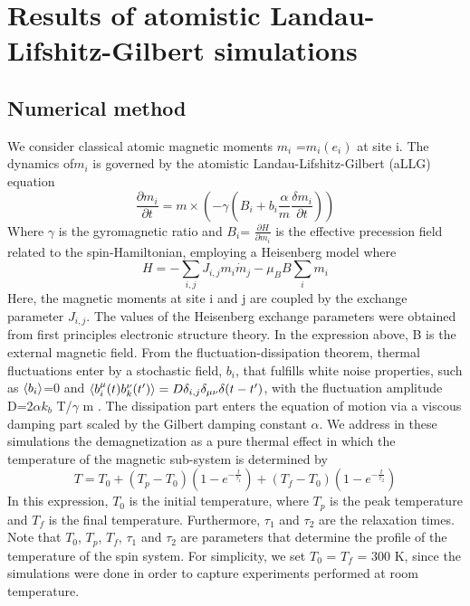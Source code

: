 \section{Results of atomistic Landau-Lifshitz-Gilbert simulations}

\subsection{Numerical method}
We consider classical atomic magnetic moments {$m_i$ }=$m_i(e_i)$ at site i. The dynamics of{$m_i$ }  is governed by the atomistic Landau-Lifshitz-Gilbert (aLLG) equation \cite{Antropov1996}
\begin{equation}
\frac{\partial m_i}{\partial t} = m \times (-\gamma(B_i+b_i\frac{\alpha}{m}\frac{\delta m_i}{\partial t}))
\end{equation}
Where $\gamma$ is the gyromagnetic ratio and $B_i$=  $\frac{\partial H}{\partial m_i}$ is the effective precession field related to the spin-Hamiltonian, employing a Heisenberg model where
\begin{equation}
H = - \sum_{i,j}J_{i,j}m_i \dot m_j - \mu_B B \sum_i m_i
\end{equation}
Here, the magnetic moments at site i and j are coupled by the exchange parameter $J_{i,j}$. The values of the Heisenberg exchange parameters were obtained from first principles electronic structure theory. In the expression above, B is the external magnetic field. From the fluctuation-dissipation theorem, thermal fluctuations enter by a stochastic field, $b_i$, that fulfills white noise properties, such as $\braket{b_i}$=0 and $\braket{b_i^\mu(t) b_k^\nu (t')}= D\delta_{i,j} \delta_{\mu \nu} \delta(t-t')$, with the fluctuation amplitude D=2$\alpha k_b$ T/$\gamma$ m . The dissipation part enters the equation of motion via a viscous damping part scaled by the Gilbert damping constant $\alpha$. We address in these simulations the demagnetization as a pure thermal effect in which the temperature of the magnetic sub-system is determined by
\begin{equation}
T = T_0 + (T_p - T_0)(1 - e^{-\frac{t}{\tau_1}})+(T_f - T_0)(1 - e^{-\frac{t}{\tau_2}})
\end{equation}
In this expression, $T_0$ is the initial temperature, where $T_p$ is the peak temperature and $T_f$ is the final temperature. Furthermore, $\tau_1$ and $\tau_2$ are the relaxation times. Note that $T_0$, $T_p$, $T_f$, $\tau_1$ and $\tau_2$ are parameters that determine the profile of the temperature of the spin system. For simplicity, we set $T_0$ = $T_f$ = 300 K, since the simulations were done in order to capture experiments performed at room temperature.


